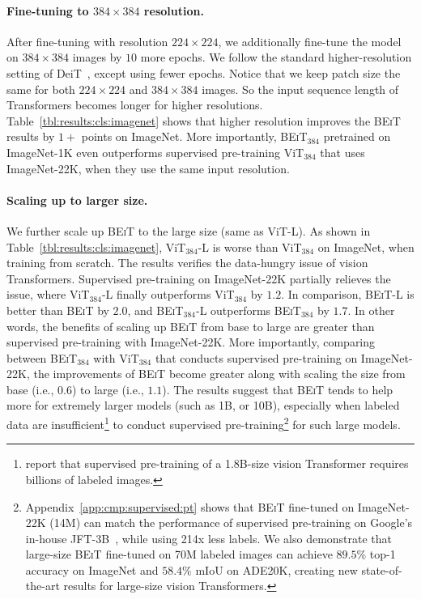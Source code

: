 \documentclass{article}
\newcommand\our{\textsc{BEiT}}
\begin{document}
\paragraph{Fine-tuning to $384\times384$ resolution.}
After fine-tuning with resolution $224\times224$, we additionally fine-tune the model on $384\times384$ images by $10$ more epochs.
We follow the standard higher-resolution setting of DeiT~\citep{deit}, except using fewer epochs.
Notice that we keep patch size the same for both $224\times224$ and $384\times384$ images. So the input sequence length of Transformers becomes longer for higher resolutions.
Table~\ref{tbl:results:cls:imagenet} shows that higher resolution improves the \our{} results by $1+$ points on ImageNet.
More importantly, \our{}$_{384}$ pretrained on ImageNet-1K even outperforms supervised pre-training ViT$_{384}$ that uses ImageNet-22K, when they use the same input resolution.


\paragraph{Scaling up to larger size.}
We further scale up \our{} to the large size (same as ViT-L).
As shown in Table~\ref{tbl:results:cls:imagenet}, ViT$_{384}$-L is worse than ViT$_{384}$ on ImageNet, when training from scratch. The results verifies the data-hungry issue of vision Transformers.
Supervised pre-training on ImageNet-22K partially relieves the issue, where ViT$_{384}$-L finally outperforms ViT$_{384}$ by $1.2$.
In comparison, \our{}-L is better than \our{} by $2.0$, and \our{}$_{384}$-L outperforms \our{}$_{384}$ by $1.7$.
In other words, the benefits of scaling up \our{} from base to large are greater than supervised pre-training with ImageNet-22K.
More importantly, comparing between \our{}$_{384}$ with ViT$_{384}$ that conducts supervised pre-training on ImageNet-22K, the improvements of \our{} become greater along with scaling the size from base (i.e., $0.6$) to large (i.e., $1.1$).
The results suggest that \our{} tends to help more for extremely larger models (such as 1B, or 10B), especially when labeled data are insufficient\footnote{\citep{scaling:vit} report that supervised pre-training of a 1.8B-size vision Transformer requires billions of labeled images.} to conduct supervised pre-training\footnote{Appendix~\ref{app:cmp:supervised:pt} shows that \our{} fine-tuned on ImageNet-22K (14M) can match the performance of supervised pre-training on Google's in-house JFT-3B~\citep{scaling:vit}, while using 214x less labels. We also demonstrate that large-size \our{} fine-tuned on 70M labeled images can achieve $89.5\%$ top-1 accuracy on ImageNet and $58.4\%$ mIoU on ADE20K, creating new state-of-the-art results for large-size vision Transformers.} for such large models.
\end{document}

